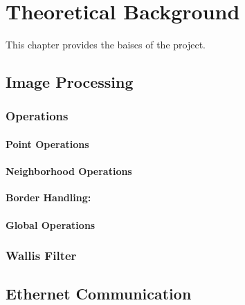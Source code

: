 %
%
\chapter{Theoretical Background} \label{chapt:theoreticalback}
This chapter provides the baiscs of the project.


%
%
\section{Image Processing} \label{chapt:theory:imageprocessing}

\subsection{Operations}

\subsubsection*{Point Operations}

\subsubsection*{Neighborhood Operations}

\textbf{Border Handling:}

\subsubsection*{Global Operations}


\subsection{Wallis Filter}



%
%
\section{Ethernet Communication} \label{chapt:theory:ethernet}

